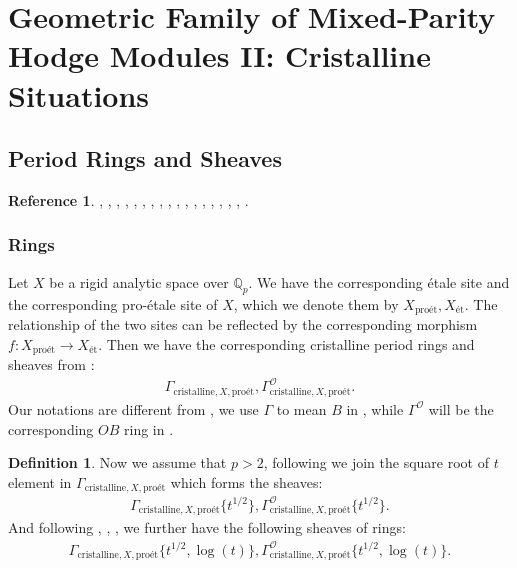 \documentclass[12pt]{book}
\theoremstyle{definition}
\newtheorem{definition}{Definition}
\newtheorem{reference}{Reference}
\begin{document}
\newpage
\section{Geometric Family of Mixed-Parity Hodge Modules II: Cristalline Situations}


\subsection{Period Rings and Sheaves}

\begin{reference}
\cite{Sch1}, \cite{KL1}, \cite{KL2}, \cite{BL1}, \cite{BL2}, \cite{BS}, \cite{BHS}, \cite{Fon1}, \cite{CS1}, \cite{CS2}, \cite{BK}, \cite{BBK}, \cite{BBBK}, \cite{KKM}, \cite{KM}, \cite{LZ}, \cite{TT}, \cite{M}.
\end{reference}

\subsubsection{Rings}

\noindent Let $X$ be a rigid analytic space over $\mathbb{Q}_p$. We have the corresponding \'etale site and the corresponding pro-\'etale site of $X$, which we denote them by $X_{\text{pro\'et}},X_\text{\'et}$. The relationship of the two sites can be reflected by the corresponding morphism $f:X_{\text{pro\'et}}\longrightarrow X_\text{\'et}$. Then we have the corresponding cristalline period rings and sheaves from \cite{TT}:
\begin{align}
\Gamma_{\text{cristalline},X,\text{pro\'et}}, \Gamma^\mathcal{O}_{\text{cristalline},X,\text{pro\'et}}.
\end{align}
Our notations are different from \cite{TT}, we use $\Gamma$ to mean $B$ in \cite{TT}, while $\Gamma^\mathcal{O}$ will be the corresponding $OB$ ring in \cite{TT}.\\

\begin{definition}
\indent Now we assume that $p>2$, following \cite{BS} we join the square root of $t$ element in $\Gamma_{\text{cristalline},X,\text{pro\'et}}$ which forms the sheaves:
\begin{align}
\Gamma_{\text{cristalline},X,\text{pro\'et}}\{t^{1/2}\},\Gamma^\mathcal{O}_{\text{cristalline},X,\text{pro\'et}}\{t^{1/2}\}.
\end{align}
And following \cite{BL1}, \cite{BL2}, \cite{Fon1}, \cite{BHS} we further have the following sheaves of rings:
\begin{align}
\Gamma_{\text{cristalline},X,\text{pro\'et}}\{t^{1/2},\log(t)\},\Gamma^\mathcal{O}_{\text{cristalline},X,\text{pro\'et}}\{t^{1/2},\log(t)\}.
\end{align}
\end{definition}
\end{document}
